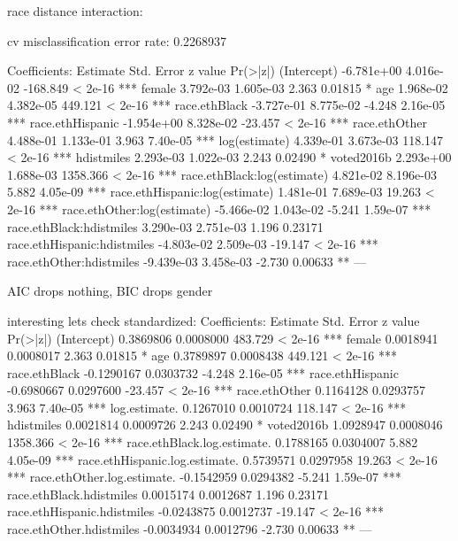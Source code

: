 race distance interaction: 

cv misclassification error rate: 0.2268937

Coefficients:
                                 Estimate Std. Error  z value Pr(>|z|)    
(Intercept)                    -6.781e+00  4.016e-02 -168.849  < 2e-16 ***
female                          3.792e-03  1.605e-03    2.363  0.01815 *  
age                             1.968e-02  4.382e-05  449.121  < 2e-16 ***
race.ethBlack                  -3.727e-01  8.775e-02   -4.248 2.16e-05 ***
race.ethHispanic               -1.954e+00  8.328e-02  -23.457  < 2e-16 ***
race.ethOther                   4.488e-01  1.133e-01    3.963 7.40e-05 ***
log(estimate)                   4.339e-01  3.673e-03  118.147  < 2e-16 ***
hdistmiles                      2.293e-03  1.022e-03    2.243  0.02490 *  
voted2016b                      2.293e+00  1.688e-03 1358.366  < 2e-16 ***
race.ethBlack:log(estimate)     4.821e-02  8.196e-03    5.882 4.05e-09 ***
race.ethHispanic:log(estimate)  1.481e-01  7.689e-03   19.263  < 2e-16 ***
race.ethOther:log(estimate)    -5.466e-02  1.043e-02   -5.241 1.59e-07 ***
race.ethBlack:hdistmiles        3.290e-03  2.751e-03    1.196  0.23171    
race.ethHispanic:hdistmiles    -4.803e-02  2.509e-03  -19.147  < 2e-16 ***
race.ethOther:hdistmiles       -9.439e-03  3.458e-03   -2.730  0.00633 ** 
---

AIC drops nothing, BIC drops gender

interesting lets check standardized:
Coefficients:
                                 Estimate Std. Error  z value Pr(>|z|)    
(Intercept)                     0.3869806  0.0008000  483.729  < 2e-16 ***
female                          0.0018941  0.0008017    2.363  0.01815 *  
age                             0.3789897  0.0008438  449.121  < 2e-16 ***
race.ethBlack                  -0.1290167  0.0303732   -4.248 2.16e-05 ***
race.ethHispanic               -0.6980667  0.0297600  -23.457  < 2e-16 ***
race.ethOther                   0.1164128  0.0293757    3.963 7.40e-05 ***
log.estimate.                   0.1267010  0.0010724  118.147  < 2e-16 ***
hdistmiles                      0.0021814  0.0009726    2.243  0.02490 *  
voted2016b                      1.0928947  0.0008046 1358.366  < 2e-16 ***
race.ethBlack.log.estimate.     0.1788165  0.0304007    5.882 4.05e-09 ***
race.ethHispanic.log.estimate.  0.5739571  0.0297958   19.263  < 2e-16 ***
race.ethOther.log.estimate.    -0.1542959  0.0294382   -5.241 1.59e-07 ***
race.ethBlack.hdistmiles        0.0015174  0.0012687    1.196  0.23171    
race.ethHispanic.hdistmiles    -0.0243875  0.0012737  -19.147  < 2e-16 ***
race.ethOther.hdistmiles       -0.0034934  0.0012796   -2.730  0.00633 ** 
---


